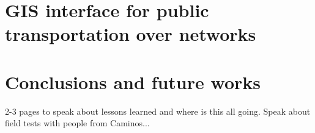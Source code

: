 \documentclass[a4paper,10pt,twoside]{book}
\begin{document}
\chapter{GIS interface for public transportation over networks}
\label{sec:gis}

	
\chapter{ Conclusions and future works}
	2-3 pages to speak about lessons learned and where is this all going. Speak about field tests with people from Caminos...

% 



\vfill \pagebreak \thispagestyle{empty} \mbox{}
\vfill \pagebreak \mbox{} \thispagestyle{empty}
\end{document}
